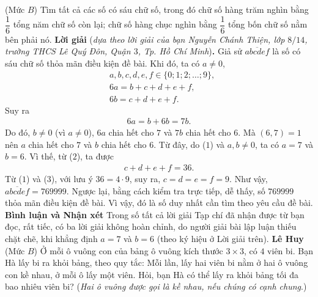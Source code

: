 \begin{multicols}{2}
	\setlength{\abovedisplayskip}{4pt}
	\setlength{\belowdisplayskip}{4pt}
	{}
	(Mức $B$) Tìm tất cả các số có sáu chữ số, trong đó chữ số hàng trăm nghìn bằng $\dfrac16$ tổng năm chữ số còn lại; chữ số hàng chục nghìn bằng $\dfrac16$  tổng bốn chữ số nằm bên phải nó.
	\vskip 0.05cm
	\textbf{\color{thachthuctoanhoc}Lời giải} (\textit{dựa theo lời giải của bạn Nguyễn Chánh Thiện, lớp $8/14$, trường THCS Lê Quý Đôn, Quận $3$, Tp. Hồ Chí Minh})\textbf{\color{thachthuctoanhoc}.}
	\vskip 0.05cm
	Giả sử $\overline{abcdef}$  là số có sáu chữ số thỏa mãn điều kiện đề bài. Khi đó, ta có $a \ne 0$,
	\begin{align*}		
		&a, b, c, d, e, f \in \{0; 1; 2; \ldots;9\}, \tag{$1$}\\
		&6a = b + c + d + e + f,\\
		&6b = c + d + e + f.\tag{$2$}
	\end{align*}  
	Suy ra
	\begin{align*}
		6a = b + 6b = 7b.
	\end{align*}
	Do đó, $b \ne 0$ (vì $a \ne 0$), $6a$ chia hết cho $7$ và $7b$ chia hết cho $6$. Mà $(6, 7) = 1$ nên $a$ chia hết cho $7$ và $b$ chia hết cho $6$. Từ đây, do ($1$) và $a, b \ne 0$, ta có $a = 7$ và $b = 6$. Vì thế, từ ($2$), ta được
	\begin{align*}
		c + d + e + f = 36.\tag{$3$}
	\end{align*}
	Từ ($1$) và ($3$), với lưu ý $36 = 4 \cdot 9$, suy ra, $c = d = e = f = 9$.
	\vskip 0.05cm
	Như vậy, $\overline {abcdef}  = 769999$.
	\vskip 0.05cm
	Ngược lại, bằng cách kiểm tra trực tiếp, dễ thấy, số $769999$ thỏa mãn điều kiện đề bài. Vì vậy, đó là số duy nhất cần tìm theo yêu cầu đề bài.
	\vskip 0.05cm
	\textbf{\color{thachthuctoanhoc}Bình luận và Nhận xét}
	\vskip 0.05cm	
	Trong số tất cả lời giải Tạp chí đã nhận được từ bạn đọc, rất tiếc, có ba lời giải không hoàn chỉnh, do người giải bài lập luận thiếu chặt chẽ, khi khẳng định $a = 7$ và $b = 6$ (theo ký hiệu ở Lời giải trên). 
	\vskip 0.1cm
	\hfill \textbf{\color{thachthuctoanhoc}Lê Huy}
	\vskip 0.1cm
	{}
	(Mức $B$)  Ở mỗi ô vuông con của bảng ô vuông kích thước $3\times3$, có $4$ viên bi. Bạn Hà lấy bi ra khỏi bảng, theo quy tắc: Mỗi lần, lấy hai viên bi nằm ở hai ô vuông con kề nhau, ở mỗi ô lấy một viên. Hỏi, bạn Hà có thể lấy ra khỏi bảng tối đa bao nhiêu viên bi?
	\vskip 0.05cm
	({\it Hai ô vuông được gọi là kề nhau, nếu chúng có cạnh chung}.)

\end{multicols}
